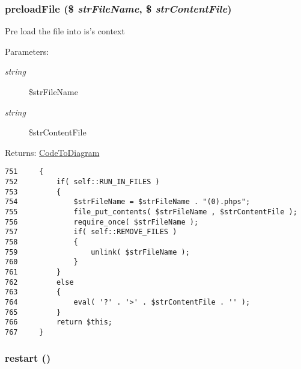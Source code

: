 \hypertarget{class_code_to_diagram_5300582d74e4550799d8bc8dffb4af19}{
\subsubsection[{preloadFile}]{\setlength{\rightskip}{0pt plus 5cm}preloadFile (\$ {\em strFileName}, \/  \$ {\em strContentFile})}}
\label{class_code_to_diagram_5300582d74e4550799d8bc8dffb4af19}


Pre load the file into is's context

\begin{Desc}
\item[Parameters:]
\begin{description}
\item[{\em string}]\$strFileName \item[{\em string}]\$strContentFile \end{description}
\end{Desc}
\begin{Desc}
\item[Returns:]\hyperlink{class_code_to_diagram}{CodeToDiagram} \end{Desc}


\begin{Code}\begin{verbatim}751     {
752         if( self::RUN_IN_FILES )
753         {
754             $strFileName = $strFileName . "(0).phps";
755             file_put_contents( $strFileName , $strContentFile );
756             require_once( $strFileName );
757             if( self::REMOVE_FILES )
758             {
759                 unlink( $strFileName );
760             }
761         }
762         else
763         {
764             eval( '?' . '>' . $strContentFile . '' );
765         }
766         return $this;
767     }
\end{verbatim}
\end{Code}


\hypertarget{class_code_to_diagram_c8de9e38ce27c87f710dff42a13455cf}{
\subsubsection[{restart}]{\setlength{\rightskip}{0pt plus 5cm}restart ()}}
\label{class_code_to_diagram_c8de9e38ce27c87f710dff42a13455cf}


